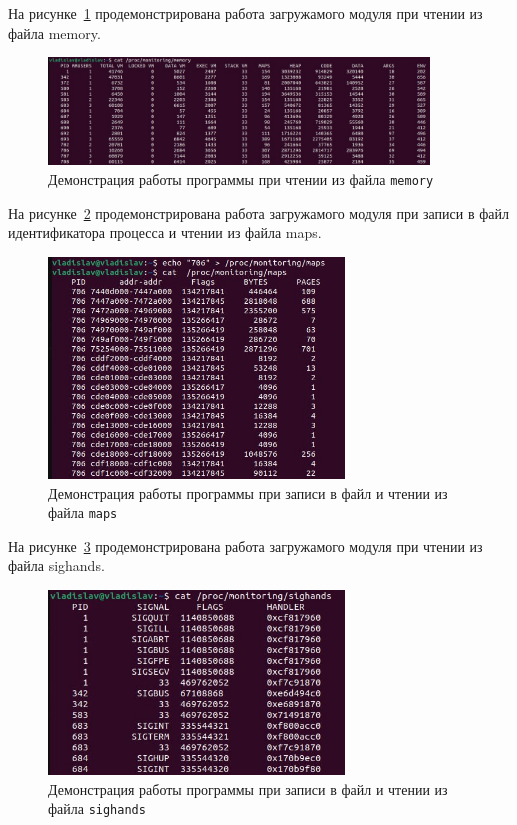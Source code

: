 На рисунке~\ref{img:example-memory} продемонстрирована работа загружамого модуля при чтении из файла memory.

\begin{figure}[h]
	\centering
	\includegraphics[width=0.9\textwidth]{img/example-memory}
	\caption{Демонстрация работы программы при чтении из файла \texttt{memory}}
	\label{img:example-memory}
\end{figure}

На рисунке~\ref{img:example-maps} продемонстрирована работа загружамого модуля при записи в файл идентификатора процесса и чтении из файла maps.

\begin{figure}[h]
	\centering
	\includegraphics[width=0.7\textwidth]{img/example-maps}
	\caption{Демонстрация работы программы при записи в файл и чтении из файла \texttt{maps}}
	\label{img:example-maps}
\end{figure}

\clearpage

На рисунке~\ref{img:example-sighand} продемонстрирована работа загружамого модуля при чтении из файла sighands.

\begin{figure}[h]
	\centering
	\includegraphics[width=0.7\textwidth]{img/example-sighand}
	\caption{Демонстрация работы программы при записи в файл и чтении из файла \texttt{sighands}}
	\label{img:example-sighand}
\end{figure}

